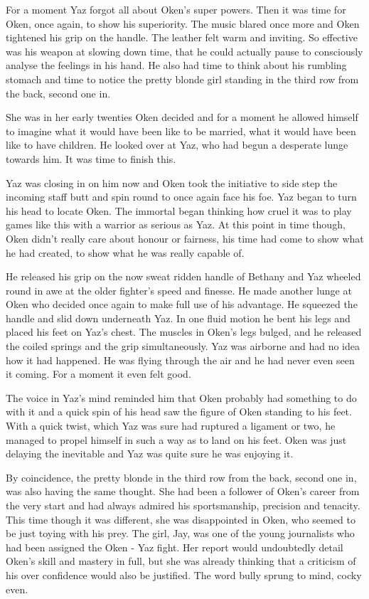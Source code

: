 For a moment Yaz forgot all about Oken's super powers. Then it was time for Oken, once again, to show his superiority. The music blared once more and Oken tightened his grip on the handle. The leather felt warm and inviting. So effective was his weapon at slowing down time, that he could actually pause to consciously analyse the feelings in his hand. He also had time to think about his rumbling stomach and time to notice the pretty blonde girl standing in the third row from the back, second one in.

She was in her early twenties Oken decided and for a moment he allowed himself to imagine what it would have been like to be married, what it would have been like to have children. He looked over at Yaz, who had begun a desperate lunge towards him. It was time to finish this.

Yaz was closing in on him now and Oken took the initiative to side step the incoming staff butt and spin round to once again face his foe. Yaz began to turn his head to locate Oken. The immortal began thinking how cruel it was to play games like this with a warrior as serious as Yaz. At this point in time though, Oken didn't really care about honour or fairness, his time had come to show what he had created, to show what he was really capable of.

He released his grip on the now sweat ridden handle of Bethany and Yaz wheeled round in awe at the older fighter's speed and finesse. He made another lunge at Oken who decided once again to make full use of his advantage. He squeezed the handle and slid down underneath Yaz. In one fluid motion he bent his legs and placed his feet on Yaz's chest. The muscles in Oken's legs bulged, and he released the coiled springs and the grip simultaneously. Yaz was airborne and had no idea how it had happened. He was flying through the air and he had never even seen it coming. For a moment it even felt good.

The voice in Yaz's mind reminded him that Oken probably had something to do with it and a quick spin of his head saw the figure of Oken standing to his feet. With a quick twist, which Yaz was sure had ruptured a ligament or two, he managed to propel himself in such a way as to land on his feet. Oken was just delaying the inevitable and Yaz was quite sure he was enjoying it.

By coincidence, the pretty blonde in the third row from the back, second one in, was also having the same thought. She had been a follower of Oken's career from the very start and had always admired his sportsmanship, precision and tenacity. This time though it was different, she was disappointed in Oken, who seemed to be just toying with his prey. The girl, Jay, was one of the young journalists who had been assigned the Oken - Yaz fight. Her report would undoubtedly detail Oken's skill and mastery in full, but she was already thinking that a criticism of his over confidence would also be justified. The word bully sprung to mind, cocky even.

